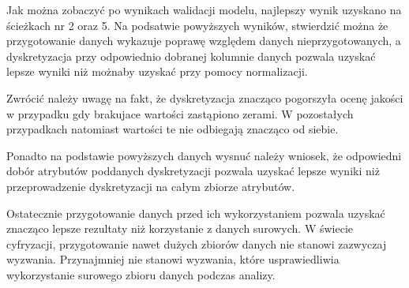 \documentclass[12pt,oneside,a4paper]{book} %
\theoremstyle{break}
\begin{document}
Jak można zobaczyć po wynikach walidacji modelu, najlepszy wynik uzyskano na ścieżkach nr 2 oraz 5. Na podsatwie powyższych wyników, stwierdzić można że przygotowanie danych wykazuje poprawę względem danych nieprzygotowanych, a dyskretyzacja przy odpowiednio dobranej kolumnie danych pozwala uzyskać lepsze wyniki niż możnaby uzyskać przy pomocy normalizacji.

Zwrócić należy uwagę na fakt, że dyskretyzacja znacząco pogorszyła ocenę jakości w przypadku gdy brakujace wartości zastąpiono zerami. W pozostałych przypadkach natomiast wartości te nie odbiegają znacząco od siebie.

Ponadto na podstawie powyższych danych wysnuć należy wniosek, że odpowiedni dobór atrybutów poddanych dyskretyzacji pozwala uzyskać lepsze wyniki niż przeprowadzenie dyskretyzacji na całym zbiorze atrybutów.

Ostatecznie przygotowanie danych przed ich wykorzystaniem pozwala uzyskać znacząco lepsze rezultaty niż korzystanie z danych surowych. W świecie cyfryzacji, przygotowanie nawet dużych zbiorów danych nie stanowi zazwyczaj wyzwania. Przynajmniej nie stanowi wyzwania, które usprawiedliwia wykorzystanie surowego zbioru danych podczas analizy.
\end{document}
